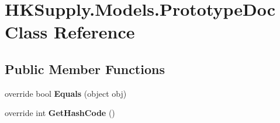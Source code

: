 \hypertarget{class_h_k_supply_1_1_models_1_1_prototype_doc}{}\section{H\+K\+Supply.\+Models.\+Prototype\+Doc Class Reference}
\label{class_h_k_supply_1_1_models_1_1_prototype_doc}
\subsection*{Public Member Functions}
\begin{DoxyCompactItemize}
\item 
\mbox{\label{class_h_k_supply_1_1_models_1_1_prototype_doc_ae18f538d6ae1e65f883342678bca2047}} 
override bool {\bfseries Equals} (object obj)
\item 
\mbox{\label{class_h_k_supply_1_1_models_1_1_prototype_doc_ae88fc48546c2730d051ce886ba842455}} 
override int {\bfseries Get\+Hash\+Code} ()
\end{DoxyCompactItemize}
